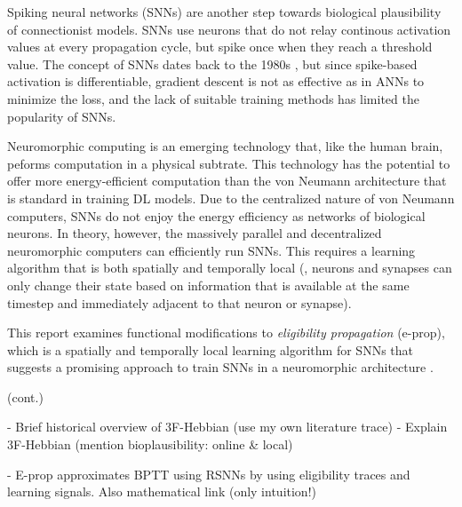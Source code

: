 Spiking neural networks (SNNs) are another step towards biological plausibility of connectionist models.
SNNs use neurons that do not relay continous activation values at every propagation cycle, but spike once when they reach a threshold value.
The concept of SNNs dates back to the 1980s \citep{hopfield1982neural}, but since spike-based activation is differentiable, gradient descent is not as effective as in ANNs to minimize the loss, and the lack of suitable training methods has limited the popularity of SNNs.

Neuromorphic computing is an emerging technology that, like the human brain, peforms computation in a physical subtrate.
This technology has the potential to offer more energy-efficient computation than the von Neumann architecture that is standard in training DL models.
Due to the centralized nature of von Neumann computers, SNNs do not enjoy the energy efficiency as networks of biological neurons.
In theory, however, the massively parallel and decentralized neuromorphic computers can efficiently run SNNs.
This requires a learning algorithm that is both spatially and temporally local (\ie, neurons and synapses can only change their state based on information that is available at the same timestep and immediately adjacent to that neuron or synapse).

This report examines functional modifications to \emph{eligibility propagation} (e-prop), which is a spatially and temporally local learning algorithm for SNNs that suggests a promising approach to train SNNs in a neuromorphic architecture \citep{bellec2020solution}.


\begin{tcolorbox}[colback=orange]
(cont.)
\vspace{10cm}

\end{tcolorbox}

\begin{tcolorbox}[colback=orange]
- Brief historical overview of 3F-Hebbian (use my own literature trace)
    - Explain 3F-Hebbian (mention bioplausibility: online \& local)


\vspace{10cm}

\end{tcolorbox}

\begin{tcolorbox}[colback=orange]

- E-prop approximates BPTT using RSNNs by using eligibility traces and learning signals. Also mathematical link (only intuition!)

\vspace{8cm}

\end{tcolorbox}

